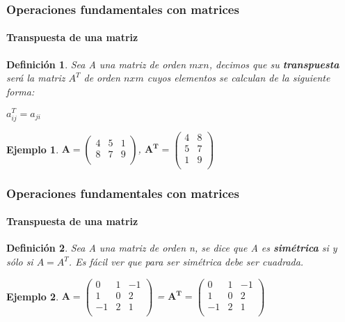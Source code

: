 \documentclass[11pt]{beamer}
\newtheorem{defi}{Definición}
\newtheorem{ejem}{Ejemplo}
\begin{document}
\begin{frame}
\frametitle{Operaciones fundamentales con matrices}
\framesubtitle{Transpuesta de una matriz}
\begin{defi}
Sea A una matriz de orden $mxn$, decimos que su \textbf{transpuesta} será la matriz $A^T$ de orden $nxm$ cuyos elementos se calculan de la siguiente forma:\\
\begin{center}
$a^{T}_{ij} = a_{ji}$
\end{center}
\end{defi}
\begin{ejem}
${\displaystyle \mathbf {A} ={\begin{pmatrix}4&5&1\\8&7&9\\\end{pmatrix}}}$, 
${\displaystyle \mathbf {A^T} ={\begin{pmatrix}4&8\\5&7\\1&9\\\end{pmatrix}}}$ 
\end{ejem}
\end{frame}

\begin{frame}
\frametitle{Operaciones fundamentales con matrices}
\framesubtitle{Transpuesta de una matriz}
\begin{defi}
Sea A una matriz de orden n, se dice que A es \textbf{simétrica} si y sólo si $A=A^T$. Es fácil ver que para ser simétrica debe ser cuadrada.
\end{defi}
\begin{ejem}
${\displaystyle \mathbf {A} ={\begin{pmatrix}0&1&-1\\1&0&2\\-1&2&1\\\end{pmatrix}}}$ = 
${\displaystyle \mathbf {A^T} ={\begin{pmatrix}0&1&-1\\1&0&2\\-1&2&1\\\end{pmatrix}}}$ 
\end{ejem}
\end{frame}
\end{document}
